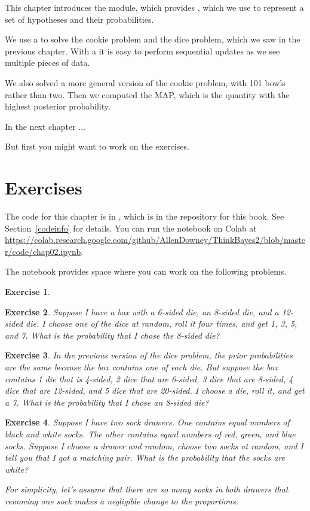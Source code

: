 \documentclass[12pt]{book}
\theoremstyle{exercise}
\newtheorem{exercise}{Exercise}[chapter]
\begin{document}
This chapter introduces the  module, which provides , which we use to represent a set of hypotheses and their probabilities.

We use a  to solve the cookie problem and the dice problem, which we saw in the previous chapter.
With a  it is easy to perform sequential updates as we see multiple pieces of data.

We also solved a more general version of the cookie problem, with 101 bowls rather than two.
Then we computed the MAP, which is the quantity with the highest posterior probability.

In the next chapter ...

But first you might want to work on the exercises.


\section{Exercises}
\label{elvis}

The code for this chapter is in , which is in the repository for this book.  See Section~\ref{codeinfo} for details.
You can run the notebook on Colab at \url{https://colab.research.google.com/github/AllenDowney/ThinkBayes2/blob/master/code/chap02.ipynb}.

The notebook provides space where you can work on the following problems.


\begin{exercise}
\end{exercise}


\begin{exercise}
Suppose I have a box with a 6-sided die, an 8-sided die, and a 12-sided die.
I choose one of the dice at random, roll it four times, and get 1, 3, 5, and 7.
What is the probability that I chose the 8-sided die?
\end{exercise}


\begin{exercise}
In the previous version of the dice problem, the prior probabilities are the same because the box contains one of each die.
But suppose the box contains 1 die that is 4-sided, 2 dice that are 6-sided, 3 dice that are 8-sided, 4 dice that are 12-sided, and 5 dice that are 20-sided.
I choose a die, roll it, and get a 7.  What is the probability that I chose an 8-sided die?
\end{exercise}


\begin{exercise}
Suppose I have two sock drawers.  
One contains equal numbers of black and white socks.  
The other contains equal numbers of red, green, and blue socks.
Suppose I choose a drawer and random, choose two socks at random, and I tell you that I got a matching pair.
What is the probability that the socks are white?

For simplicity, let's assume that there are so many socks in both drawers that removing one sock makes a negligible change to the proportions.
\end{exercise}
\end{document}
